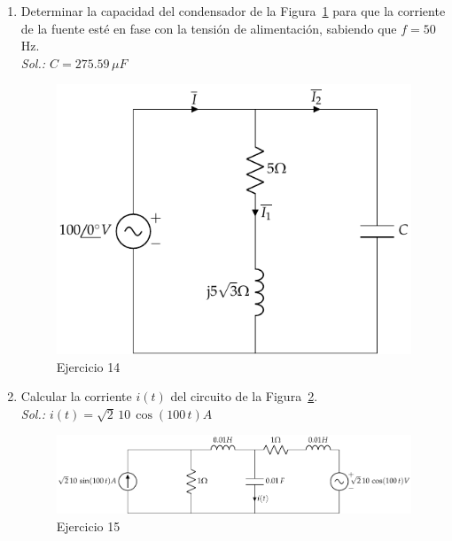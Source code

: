 \documentclass[11pt]{book} %
\begin{document}
\begin{enumerate}
\item Determinar la capacidad del condensador de la Figura~\ref{fig.ejemplo9_BT2} para que la corriente de la fuente esté en fase con la tensión de alimentación, sabiendo que $f=50$ Hz.\\
\emph{Sol.: $C=275.59\,\mu F$}
	    \begin{figure}[H]
	        \centering
	        \includegraphics{../figs/ejemplo9_BT2.pdf}
	        \caption{Ejercicio 14}
	        \label{fig.ejemplo9_BT2}
	    \end{figure}
\item Calcular la corriente $i(t)$ del circuito de la Figura~\ref{fig.ejercicio13_BT2}.\\
\emph{Sol.: $i(t)=\sqrt{2}\,10\,\cos(100\,t) A$}
\begin{figure}[htbp]
    \centering
    \includegraphics[width=\linewidth]{../figs/ejercicio13_BT2.pdf}
    \caption{Ejercicio 15}
    \label{fig.ejercicio13_BT2}
\end{figure}


\end{enumerate}
\end{document}
